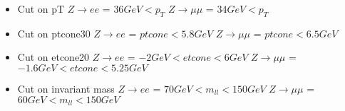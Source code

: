 \documentclass[11pt]{article}
\begin{document}
\begin{itemize}
    \item Cut on pT
    \subitem $Z \rightarrow ee$ = $36 GeV < p_T$
    \subitem $Z \rightarrow \mu\mu$ = $34 GeV < p_T$

    \item Cut on ptcone30
    \subitem $Z \rightarrow ee$ = $ ptcone < 5.8 GeV$
    \subitem $Z \rightarrow \mu\mu$ = $ ptcone < 6.5 GeV$

    \item Cut on etcone20
    \subitem $Z \rightarrow ee$ = $ -2 GeV < etcone < 6 GeV$
    \subitem $Z \rightarrow \mu\mu$ = $ -1.6 GeV < etcone < 5.25 GeV$

    \item Cut on invariant mass
    \subitem $Z \rightarrow ee$ = $70 GeV < m_{ll} < 150 GeV$
    \subitem $Z \rightarrow \mu\mu$ = $60 GeV < m_{ll} < 150 GeV$
\end{itemize}
\end{document}
